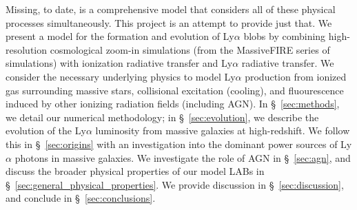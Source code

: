 Missing, to date, is a comprehensive model that considers all of these physical processes simultaneously.
This project is an attempt to provide just that.
We present a model for the formation and evolution of Ly$\alpha$ blobs by combining high-resolution cosmological zoom-in simulations (from the MassiveFIRE series of simulations) with ionization radiative transfer and Ly$\alpha$ radiative transfer.
We consider the necessary underlying physics to model Ly$\alpha$ production from ionized gas surrounding massive stars, collisional excitation (cooling), and fluourescence induced by other ionizing radiation fields (including AGN).
In \S~\ref{sec:methods}, we detail our numerical methodology; in \S~\ref{sec:evolution}, we describe the evolution of the Ly$\alpha$ luminosity from massive galaxies at high-redshift.
We follow this in \S~\ref{sec:origins} with an investigation into the dominant power sources of Ly$\alpha$ photons in massive galaxies.
We investigate the role of AGN in \S~\ref{sec:agn}, and discuss the broader physical properties of our model LABs in \S~\ref{sec:general_physical_properties}.
We provide discussion in \S~\ref{sec:discussion}, and conclude in \S~\ref{sec:conclusions}.

